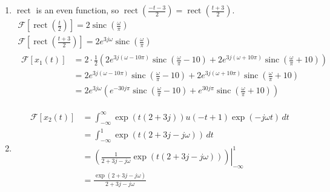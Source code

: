 \documentclass[12pt]{article}
\newcommand{\rect}{\operatorname{rect}}
\newcommand{\sinc}{\operatorname{sinc}}
\begin{document}
\begin{enumerate}
\begin{enumerate}
\begin{enumerate}
                              \item $\rect$ is an even function, so $\rect\left(\frac{-t-3}{2}\right)=\rect\left(\frac{t+3}{2}\right)$.
                                    \begin{gather*}
                                          \mathcal{F}\left[\rect\left(\frac{t}{2}\right)\right] = 2\sinc\left(\frac{\omega}{\pi}\right) \\
                                          \mathcal{F}\left[\rect\left(\frac{t+3}{2}\right)\right] = 2e^{3j\omega}\sinc\left(\frac{\omega}{\pi}\right) \\
                                          \begin{align*}
                                                \mathcal{F}[x_1(t)]
                                                 & = 2 \cdot \frac{1}{2}\left(2e^{3j(\omega-10\pi)}\sinc\left(\frac{\omega}{\pi}-10\right)+2e^{3j(\omega+10\pi)}\sinc\left(\frac{\omega}{\pi}+10\right)\right) \\
                                                 & = 2e^{3j(\omega-10\pi)}\sinc\left(\frac{\omega}{\pi}-10\right)+2e^{3j(\omega+10\pi)}\sinc\left(\frac{\omega}{\pi}+10\right)                                 \\
                                                 & = \boxed{2e^{3j\omega}\left(e^{-30j\pi}\sinc\left(\frac{\omega}{\pi}-10\right)+e^{30j\pi}\sinc\left(\frac{\omega}{\pi}+10\right)\right)}
                                          \end{align*}
                                    \end{gather*}
                              \item \[\begin{aligned}
                                                \mathcal{F}[x_2(t)]
                                                 & = \int_{-\infty}^{\infty} \exp(t(2+3j))u(-t+1)\exp(-j\omega t)\,dt                  \\
                                                 & = \int_{-\infty}^{1} \exp(t(2+3j-j\omega))\,dt                                      \\
                                                 & = \left.\left(\frac{1}{2+3j-j\omega}\exp(t(2+3j-j\omega))\right)\right|^1_{-\infty} \\
                                                 & = \boxed{\frac{\exp(2+3j-j\omega)}{2+3j-j\omega}}
                                          \end{aligned}\]

\end{enumerate}
\end{enumerate}
\end{enumerate}
\end{document}
